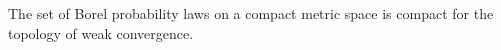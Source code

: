 The set of Borel probability laws on a compact metric space is compact for the topology of weak convergence.